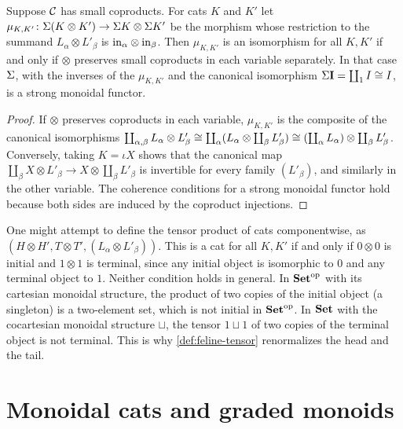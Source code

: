 \begin{proposition}\label{prop:body-monoidal}
Suppose $\mathcal{C}$ has small coproducts. For cats $K$ and $K'$ let
$\mu_{K,K'}\colon\Sigma(K\otimes K')\to\Sigma K\otimes\Sigma K'$ be the morphism whose
restriction to the summand $L_\alpha\otimes L'_\beta$ is $\mathrm{in}_\alpha\otimes\mathrm{in}_\beta$.
Then $\mu_{K,K'}$ is an isomorphism for all $K,K'$ if and only if $\otimes$
preserves small coproducts in each variable separately. In that case
$\Sigma$, with the inverses of the $\mu_{K,K'}$ and the canonical isomorphism
$\Sigma\mathbf I=\coprod_1I\cong I$, is a strong monoidal functor.
\end{proposition}

\begin{proof}
If $\otimes$ preserves coproducts in each variable, $\mu_{K,K'}$ is the
composite of the canonical isomorphisms
$\coprod_{\alpha,\beta}L_\alpha\otimes L'_\beta\cong\coprod_\alpha(L_\alpha\otimes\coprod_\beta L'_\beta)\cong(\coprod_\alpha L_\alpha)\otimes\coprod_\beta L'_\beta$.
Conversely, taking $K=\iota X$ shows that the canonical map
$\coprod_\beta X\otimes L'_\beta\to X\otimes\coprod_\beta L'_\beta$ is invertible for
every family $(L'_\beta)$, and similarly in the other variable. The coherence
conditions for a strong monoidal functor hold because both sides are induced
by the coproduct injections.
\end{proof}

\begin{remark}\label{rem:naive-tensor}
One might attempt to define the tensor product of cats componentwise, as
$(H\otimes H',T\otimes T',(L_\alpha\otimes L'_\beta))$. This is a cat for all
$K,K'$ if and only if $0\otimes0$ is initial and $1\otimes1$ is terminal, since
any initial object is isomorphic to $0$ and any terminal object to $1$. Neither
condition holds in general. In $\mathbf{Set}^{\mathrm{op}}$ with its cartesian monoidal
structure, the product of two copies of the initial object (a singleton) is a
two-element set, which is not initial in $\mathbf{Set}^{\mathrm{op}}$. In $\mathbf{Set}$ with the
cocartesian monoidal structure $\sqcup$, the tensor $1\sqcup1$ of two copies of
the terminal object is not terminal. This is why \cref{def:feline-tensor}
renormalizes the head and the tail.
\end{remark}

\section{Monoidal cats and graded monoids}\label{sec:graded}

